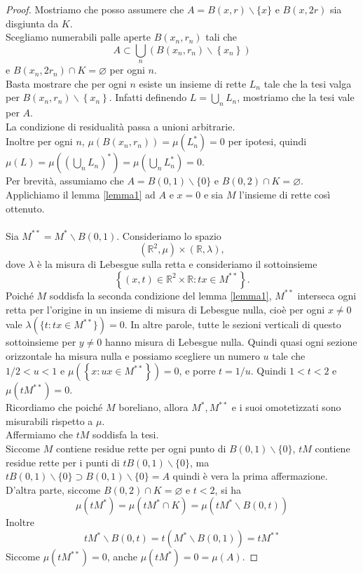 \documentclass[a4paper, twoside,openright]{article}
\newcommand{\<}{\langle}
\renewcommand{\>}{\rangle}
\begin{document}
\begin{proof}
Mostriamo che posso assumere che $A=B(x, r) \backslash\{x\}$ e $B(x, 2 r)$ sia disgiunta da $K$.\\
Scegliamo numerabili palle aperte $B\left(x_{n}, r_{n}\right)$ tali che
$$
A \subset \bigcup_{n}\left(B\left(x_{n}, r_{n}\right) \backslash\left\{x_{n}\right\}\right)
$$
e $B\left(x_{n}, 2 r_{n}\right) \cap K=\varnothing$ per ogni $n$.\\
Basta mostrare che per ogni $n$ esiste un insieme di rette $L_{n}$ tale che la tesi valga per $B\left(x_{n}, r_{n}\right) \backslash\left\{x_{n}\right\}$. Infatti definendo $L=\bigcup_n L_n$, mostriamo che la tesi vale per $A$.\\
La condizione di residualità passa a unioni arbitrarie.\\
Inoltre per ogni $n$, $\mu(B(x_n,r_n))=\mu(L_n^*)=0$ per ipotesi, quindi $\mu(L)=\mu((\bigcup_nL_n)^*) = \mu(\bigcup_n L_n^*)=0$.\\
Per brevità, assumiamo che $A=B(0,1) \backslash\{0\}$ e $B(0,2) \cap K=\varnothing$. Applichiamo il lemma \ref{lemma1} ad $A$ e $x=0$ e sia $M$ l'insieme di rette così ottenuto.\\
\hfill \\
Sia $M^{* *}=M^{*} \backslash B(0,1)$. Consideriamo lo spazio
$$
\left(\mathbb{R}^{2}, \mu\right) \times(\mathbb{R}, \lambda),
$$
dove $\lambda$ è la misura di Lebesgue sulla retta e consideriamo il sottoinsieme
$$
\left\{(x, t) \in \mathbb{R}^{2} \times \mathbb{R}: t x \in M^{* *}\right\} .
$$
Poiché $M$ soddisfa la seconda condizione del lemma \ref{lemma1}, $M^{**}$ interseca ogni retta per l'origine in un insieme di misura di Lebesgue nulla, cioè per ogni $x \neq 0$ vale $\lambda(\{t: tx \in M^{**}\})=0$. In altre parole, tutte le sezioni verticali di questo sottoinsieme per $y\neq 0$  hanno misura di Lebesgue nulla. Quindi quasi ogni sezione orizzontale ha misura nulla e possiamo scegliere un numero $u$ tale che $1 / 2<u<1$ e $\mu\left(\left\{x: u x \in M^{* *}\right\}\right)=0$, e porre $t=1 / u$. Quindi $1<t<2$ e $\mu\left(t M^{* *}\right)=0$.\\
Ricordiamo che poiché $M$ boreliano, allora $M^*, M^{**}$ e i suoi omotetizzati sono misurabili rispetto a $\mu$.\\
Affermiamo che $t M$ soddisfa la tesi.\\
Siccome $M$ contiene residue rette per ogni punto di $B(0,1) \backslash\{0\}$, $t M$ contiene residue rette per i punti di $t B(0,1) \backslash\{0\}$, ma $t B(0,1) \backslash\{0\} \supset B(0,1) \backslash\{0\}=A$ quindi è vera la prima affermazione.\\
D'altra parte, siccome $B(0,2) \cap K=\varnothing$ e $t<2$, si ha
$$
\mu\left(t M^{*}\right)=\mu\left(t M^{*} \cap K\right)=\mu\left(t M^{*} \backslash B(0, t)\right)
$$
Inoltre
$$
t M^{*} \backslash B(0, t)=t\left(M^{*} \backslash B(0,1)\right)=t M^{* *}
$$
Siccome $\mu\left(t M^{* *}\right)=0$, anche $\mu (tM^*)= 0= \mu(A)$.

\end{proof}
\end{document}
